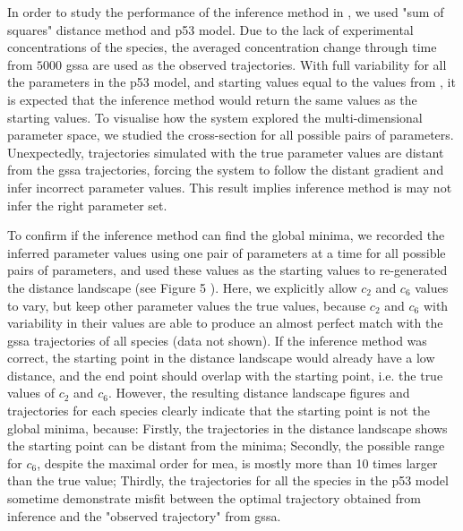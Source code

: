 In order to study the performance of the inference method in \means, we used "sum of squares" distance method and p53 model. 
Due to the lack of experimental concentrations of the species, the averaged concentration change through time from $5000$ \gls{gssa} are used as the observed trajectories. 
With full variability for all the parameters in the p53 model, and starting values equal to the values from \cite{gillespie_general_1976}, it is expected that the inference method would return the same values as the starting values. 
To visualise how the system explored the multi-dimensional parameter space, we studied the cross-section for all possible pairs of parameters.  
Unexpectedly, trajectories simulated with the true parameter values are distant from the \gls{gssa} trajectories, forcing the system to follow the distant gradient and infer incorrect parameter values. This result implies inference method is may not infer the right parameter set. 

To confirm if the inference method can find the global minima, we recorded the inferred parameter values using one pair of parameters at a time for all possible pairs of parameters, and used these values as the starting values to re-generated the distance landscape (see Figure 5 ). 
Here, we explicitly allow $c_2$ and $c_6$ values to vary, but keep other parameter values the true values, because $c_2$ and $c_6$ with variability in their values are able to produce an almost perfect match with the \gls{gssa} trajectories of all species (data not shown). 
If the inference method was correct, the starting point in the distance landscape would already have a low distance, and the end point should overlap with the starting point, i.e. the true values of $c_2$ and $c_6$.
However, the resulting distance landscape figures and trajectories for each species clearly indicate that the starting point is not the global minima, because: Firstly, the trajectories in the distance landscape shows the starting point can be distant from the minima; Secondly, the possible range for $c_6$, despite the maximal order for \gls{mea}, is mostly more than 10 times larger than the true value; Thirdly, the trajectories for all the species in the p53 model sometime demonstrate misfit between the optimal trajectory obtained from inference and the "observed trajectory" from \gls{gssa}. 

